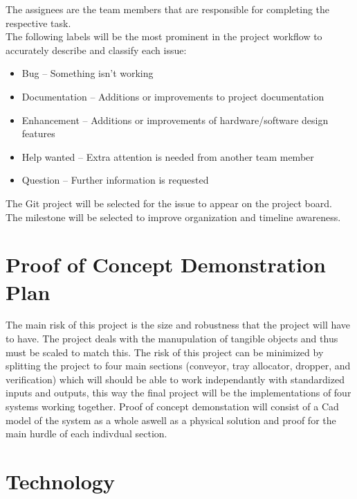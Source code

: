 \documentclass{article}
\begin{document}
	\noindent The assignees are the team members that are responsible for completing the respective task.\\

	\noindent The following labels will be the most prominent in the project workflow to accurately describe and classify each issue: 

	\begin{itemize}
		\item Bug – Something isn’t working
		\item Documentation – Additions or improvements to project documentation 
		\item Enhancement – Additions or improvements of hardware/software design features 
		\item Help wanted – Extra attention is needed from another team member 
		\item Question – Further information is requested 
	\end{itemize}
	\noindent The Git project will be selected for the issue to appear on the project board.\\

	\noindent The milestone will be selected to improve organization and timeline awareness.\\
	
	\section{Proof of Concept Demonstration Plan}
	
	The main risk of this project is the size and robustness that the project will have to have. The project deals with the manupulation of tangible objects and thus must be scaled to match this.
	The risk of this project can be minimized by splitting the project to four main sections (conveyor, tray allocator, dropper, and verification) which will should be able to work independantly with standardized inputs and outputs, this way the final project will be 
	the implementations of four systems working together. Proof of concept demonstation will consist of a Cad model of the system as a whole aswell as a physical solution and proof for the main hurdle of each indivdual section.
	
	
	\section{Technology}
	
\end{document}
